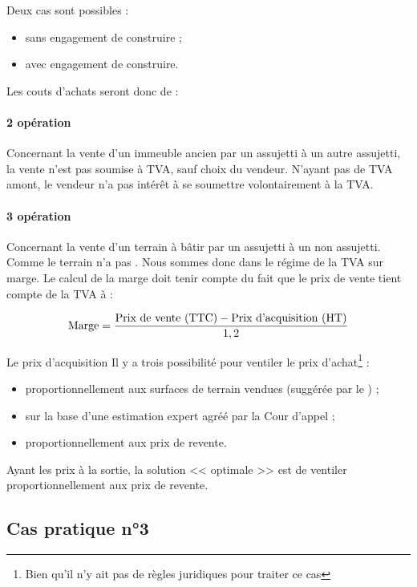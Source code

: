 		Deux cas sont possibles :
		\begin{itemize}
			\item sans engagement de construire ;
			\item avec engagement de construire.
		\end{itemize}
		
		Les couts d'achats seront donc de : 
		
		\paragraph{2\ieme{} opération} Concernant la vente d'un immeuble ancien par un assujetti à un autre assujetti, la vente n'est pas soumise à TVA, sauf choix du vendeur. N'ayant pas de TVA amont, le vendeur n'a pas intérêt à se soumettre volontairement à la TVA.
		
		\paragraph{3\ieme{} opération} Concernant la vente d'un terrain à bâtir par un assujetti à un non assujetti. Comme le terrain n'a pas . Nous sommes donc dans le régime de la TVA sur marge. Le calcul de la marge doit tenir compte du fait que le prix de vente tient compte de la TVA à  :
		
		\[ \textmd{Marge} = \frac{\textmd{Prix de vente (TTC)} -\textmd{Prix d'acquisition (HT)} }{1,2} \]
		
		\medskip Le prix d'acquisition Il y a trois possibilité pour ventiler le prix d'achat\footnote{Bien qu'il n'y ait pas de règles juridiques pour traiter ce cas} :
		\begin{itemize}
			\item proportionnellement aux surfaces de terrain vendues (suggérée par le \bofip) ;
			\item sur la base d'une estimation expert agréé par la Cour d'appel ;
			\item proportionnellement aux prix de revente.
		\end{itemize}
		Ayant les prix à la sortie, la solution << optimale >> est de ventiler proportionnellement aux prix de revente.
		
	
	\subsection*{Cas pratique n°3}
	
